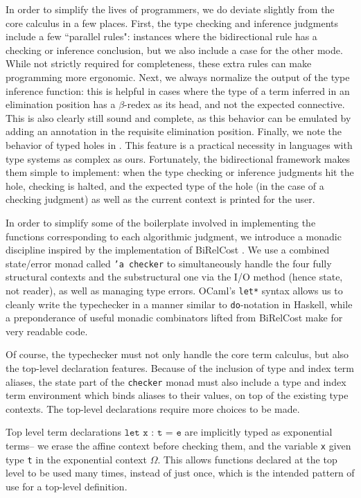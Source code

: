 In order to simplify the lives of programmers, we do deviate slightly from the core calculus in a few places. First, the type checking and inference judgments include a few ``parallel rules": instances where the bidirectional rule has a checking or inference conclusion, but we also include a case for the other mode. While not strictly required for completeness, these extra rules can make programming more ergonomic. Next, we always normalize the output of the type inference function: this is helpful in cases where the type of a term inferred in an elimination position has a $\beta$-redex as its head, and not the expected connective. This is also clearly still sound and complete, as this behavior can be emulated by adding an annotation in the requisite elimination position. Finally, we note the behavior of typed holes in \lambdaamorimpl. This feature is a practical necessity in languages with type systems as complex as ours. Fortunately, the bidirectional framework makes them simple to implement: when the type checking or inference judgments hit the hole, checking is halted, and the expected type of the hole (in the case of a checking judgment) as well as the current context is printed for the user.

In order to simplify some of the boilerplate involved in implementing the functions corresponding to each algorithmic judgment, we introduce a monadic discipline inspired by the implementation of BiRelCost \citehere. We use a combined state/error monad called \texttt{'a checker} to simultaneously handle the four fully structural contexts and the substructural one via the I/O method (hence state, not reader), as well as managing type errors. OCaml's \texttt{let*} syntax allows us to cleanly write the typechecker in a manner similar to \texttt{do}-notation in Haskell, while a preponderance of useful monadic combinators lifted from BiRelCost make for very readable code.

Of course, the typechecker must not only handle the core term calculus, but also the top-level declaration features. Because of the inclusion of type and index term aliases, the state part of the \texttt{checker} monad must also include a type and index term environment which binds aliases to their values, on top of the existing type contexts. The top-level declarations require more choices to be made. 

Top level term declarations $\texttt{let x : t = e}$ are implicitly typed as exponential terms-- we erase the affine context before checking them, and the variable \texttt{x} given type \texttt{t} in the exponential context $\Omega$. This allows functions declared at the top level to be used many times, instead of just once, which is the intended pattern of use for a top-level definition.

